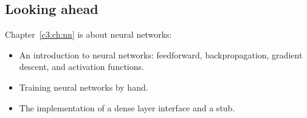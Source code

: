 \subsection*{Looking ahead}
Chapter~\ref{c3:ch:nn} is about neural networks:
\begin{itemize}
  \item An introduction to neural networks: feedforward, backpropagation, gradient descent, and
    activation functions.
  \item Training neural networks by hand.
  \item The implementation of a dense layer interface and a stub.
\end{itemize}
